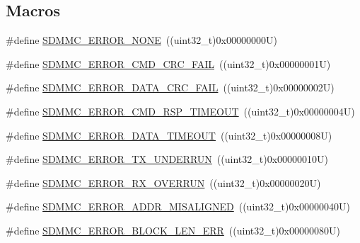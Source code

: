 \subsection*{Macros}
\begin{DoxyCompactItemize}
\item 
\#define \mbox{\hyperlink{group___s_d_m_m_c___l_l___exported___constants_ga93073e91908c0e8527a4bcb2c3dd95f1}{S\+D\+M\+M\+C\+\_\+\+E\+R\+R\+O\+R\+\_\+\+N\+O\+NE}}~((uint32\+\_\+t)0x00000000\+U)
\item 
\#define \mbox{\hyperlink{group___s_d_m_m_c___l_l___exported___constants_ga29339b7153b88dc4eaf4faa7b46ccc4d}{S\+D\+M\+M\+C\+\_\+\+E\+R\+R\+O\+R\+\_\+\+C\+M\+D\+\_\+\+C\+R\+C\+\_\+\+F\+A\+IL}}~((uint32\+\_\+t)0x00000001\+U)
\item 
\#define \mbox{\hyperlink{group___s_d_m_m_c___l_l___exported___constants_ga6a742a4691747d28e434d78db107e270}{S\+D\+M\+M\+C\+\_\+\+E\+R\+R\+O\+R\+\_\+\+D\+A\+T\+A\+\_\+\+C\+R\+C\+\_\+\+F\+A\+IL}}~((uint32\+\_\+t)0x00000002\+U)
\item 
\#define \mbox{\hyperlink{group___s_d_m_m_c___l_l___exported___constants_ga9499308f3d28ad8043a9b53c779e23b4}{S\+D\+M\+M\+C\+\_\+\+E\+R\+R\+O\+R\+\_\+\+C\+M\+D\+\_\+\+R\+S\+P\+\_\+\+T\+I\+M\+E\+O\+UT}}~((uint32\+\_\+t)0x00000004\+U)
\item 
\#define \mbox{\hyperlink{group___s_d_m_m_c___l_l___exported___constants_gab626df2cece3785818557223caad77d8}{S\+D\+M\+M\+C\+\_\+\+E\+R\+R\+O\+R\+\_\+\+D\+A\+T\+A\+\_\+\+T\+I\+M\+E\+O\+UT}}~((uint32\+\_\+t)0x00000008\+U)
\item 
\#define \mbox{\hyperlink{group___s_d_m_m_c___l_l___exported___constants_ga3f6e41553c567de7a6cdd411541f3095}{S\+D\+M\+M\+C\+\_\+\+E\+R\+R\+O\+R\+\_\+\+T\+X\+\_\+\+U\+N\+D\+E\+R\+R\+UN}}~((uint32\+\_\+t)0x00000010\+U)
\item 
\#define \mbox{\hyperlink{group___s_d_m_m_c___l_l___exported___constants_ga644d8cdeaa0f51fd52485d1eef9205c8}{S\+D\+M\+M\+C\+\_\+\+E\+R\+R\+O\+R\+\_\+\+R\+X\+\_\+\+O\+V\+E\+R\+R\+UN}}~((uint32\+\_\+t)0x00000020\+U)
\item 
\#define \mbox{\hyperlink{group___s_d_m_m_c___l_l___exported___constants_gaebcb686c7ca19de6ac32a40107b265f5}{S\+D\+M\+M\+C\+\_\+\+E\+R\+R\+O\+R\+\_\+\+A\+D\+D\+R\+\_\+\+M\+I\+S\+A\+L\+I\+G\+N\+ED}}~((uint32\+\_\+t)0x00000040\+U)
\item 
\#define \mbox{\hyperlink{group___s_d_m_m_c___l_l___exported___constants_ga45e1b7e2df402602146fe4e362666c1e}{S\+D\+M\+M\+C\+\_\+\+E\+R\+R\+O\+R\+\_\+\+B\+L\+O\+C\+K\+\_\+\+L\+E\+N\+\_\+\+E\+RR}}~((uint32\+\_\+t)0x00000080\+U)

\end{DoxyCompactItemize}

